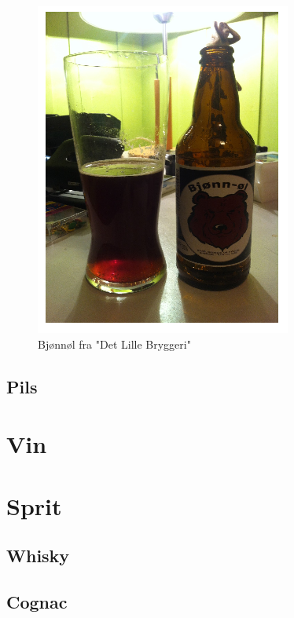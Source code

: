 \documentclass[12pt,a4paper,oneside,norsk]{article}
\begin{document}
\begin{figure} [H]
\centering
\includegraphics[scale=1.00]{Bilder/Ol/bjonnol.png} %
\caption{Bjønnøl fra "Det Lille Bryggeri"}
\end{figure}


\newpage
\subsection{Pils}

\newpage
\section{Vin}

\newpage
\section{Sprit}
\subsection{Whisky}

\newpage
\subsection{Cognac}
\end{document}
